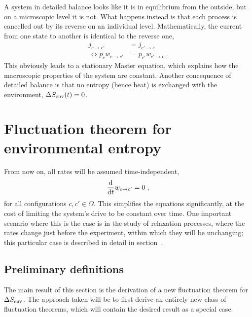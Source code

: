 A system in detailed balance looks like it is in equilibrium from the outside, but on a microscopic level it is not. What happens instead is that each process is cancelled out by its reverse on an individual level. Mathematically, the current from one state to another is identical to the reverse one,
%
\begin{align}
	j_{c\to c'} &= j_{c'\to c} \\
	\Leftrightarrow p_cw_{c\to c'} &= p_{c'}w_{c'\to c} ~.
\end{align}
%
This obviously leads to a stationary Master equation, which explains how the macroscopic properties of the system are constant. Another concequence of detailed balance is that no entropy (hence heat) is exchanged with the environment, \(\Delta S_\text{env}(t)=0\).





\section{Fluctuation theorem for environmental entropy}


From now on, all rates will be assumed time-independent,
\begin{equation}
	\frac{\mathrm{d} }{\mathrm{d} t}w_{c\to c'} = 0 ~,
\end{equation}
%
for all configurations \(c, c'\in\Omega\). This simplifies the equations significantly, at the cost of limiting the system's drive to be constant over time. One important scenario where this is the case is in the study of relaxation processes, where the rates change just before the experiment, within which they will be unchanging; this particular case is described in detail in section~.



\subsection{Preliminary definitions}

The main result of this section is the derivation of a new fluctuation theorem for \(\Delta S_\text{env}\). The approach taken will be to first derive an entirely new class of fluctuation theorems, which will contain the desired result as a special case.

